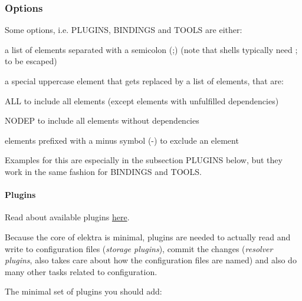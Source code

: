 \subsubsection*{Options}

Some options, i.\+e. {\ttfamily P\+L\+U\+G\+I\+NS}, {\ttfamily B\+I\+N\+D\+I\+N\+GS} and {\ttfamily T\+O\+O\+LS} are either\+:


\begin{DoxyItemize}
\item a list of elements separated with a semicolon ({\ttfamily ;}) (note that shells typically need {\ttfamily ;} to be escaped)
\item a special uppercase element that gets replaced by a list of elements, that are\+:
\begin{DoxyItemize}
\item {\ttfamily A\+LL} to include all elements (except elements with unfulfilled dependencies)
\item {\ttfamily N\+O\+D\+EP} to include all elements without dependencies
\end{DoxyItemize}
\item elements prefixed with a minus symbol ({\ttfamily -\/}) to exclude an element
\end{DoxyItemize}

Examples for this are especially in the subsection {\ttfamily P\+L\+U\+G\+I\+NS} below, but they work in the same fashion for {\ttfamily B\+I\+N\+D\+I\+N\+GS} and {\ttfamily T\+O\+O\+LS}.

\paragraph*{Plugins}

Read about available plugins \hyperlink{src_plugins_README_md}{here}.

Because the core of elektra is minimal, plugins are needed to actually read and write to configuration files ({\itshape storage plugins}), commit the changes ({\itshape resolver plugins}, also takes care about how the configuration files are named) and also do many other tasks related to configuration.

The minimal set of plugins you should add\+:


